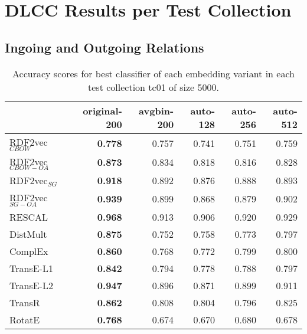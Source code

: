 \documentclass[11pt,titlepage,oneside,openany]{book}
\begin{document}
\newpage

\section{DLCC Results per Test Collection}
\label{sec:dlcc-results-tc}

\subsection{Ingoing and Outgoing Relations}
\label{subsec:dlcc-results-tc01-tc02-tc03}


\begin{table}[h!]
\centering
\begin{tabular}{lrrrrr}
\toprule
{} &  original-200 &  avgbin-200 &  auto-128 &  auto-256 &  auto-512 \\
\midrule
RDF2vec$_{CBOW}$     &	\textbf{0.778} &       0.757  &     0.741  &     0.751  &     0.759  \\
RDF2vec$_{CBOW-OA}$  &	\textbf{0.873} &       0.834  &     0.818  &     0.816  &     0.828  \\
RDF2vec$_{SG}$       &	\textbf{0.918} &       0.892  &     0.876  &     0.888  &     0.893  \\
RDF2vec$_{SG-OA}$    &	\textbf{0.939} &       0.899  &     0.868  &     0.879  &     0.902  \\
RESCAL               &	\textbf{0.968} &       0.913  &     0.906  &     0.920  &     0.929  \\
DistMult             &	\textbf{0.875} &       0.752  &     0.758  &     0.773  &     0.797  \\
ComplEx              &	\textbf{0.860} &       0.768  &     0.772  &     0.799  &     0.800  \\
TransE-L1            &	\textbf{0.842} &       0.794  &     0.778  &     0.788  &     0.797  \\
TransE-L2            &	\textbf{0.947} &       0.896  &     0.871  &     0.899  &     0.911  \\
TransR               &	\textbf{0.862} &       0.808  &     0.804  &     0.796  &     0.825  \\
RotatE               &	\textbf{0.768} &       0.674  &     0.670  &     0.680  &     0.678  \\
\bottomrule
\end{tabular}
\caption{Accuracy scores for best classifier of each embedding variant in each test collection tc01 of size 5000.}
\label{tab:dlcc-acc-tc01-5000}
\end{table}
\end{document}
